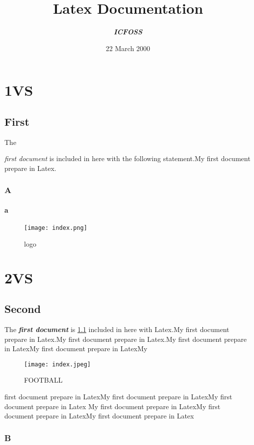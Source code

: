 \documentclass[12pt]{report} %
\begin{document}
\title{Latex Documentation}
\author{\textbf{\textit{ICFOSS}}}
\date{22 March 2000}
\maketitle

\chapter{1VS}
\section*{First}
The {\textit{first document} is included in here with the following statement.My first document prepare in Latex.
\subsection*{A}
\subsubsection{a}

\begin{figure}
\centering
\texttt{[image: index.png]}
\caption{logo}
\label{vs}
\end{figure}

\chapter{2VS}
\section*{Second}
The \textit{\textbf{first document}} is \ref{vs}
included in here with Latex.My first document prepare in Latex.My first document prepare in Latex.My first document prepare in LatexMy first document prepare in LatexMy 

\begin{figure}[h!]
\texttt{[image: index.jpeg]}
\caption{FOOTBALL} %
\end{figure}

first document prepare in LatexMy first document prepare in LatexMy first document prepare in Latex My first document prepare in LatexMy first document prepare in LatexMy first document prepare in Latex
\subsection*{B}
}
\end{document}
